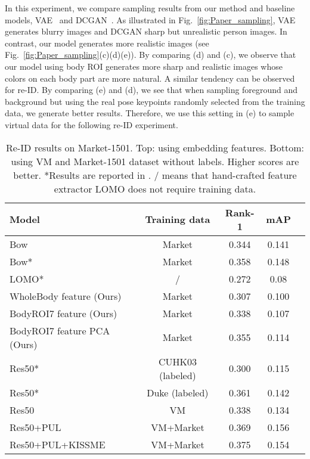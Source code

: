 \documentclass[10pt,twocolumn,letterpaper]{article}
\begin{document}
In this experiment, we compare sampling results from our method and baseline models, \ie VAE~\cite{VAE} and DCGAN~\cite{DCGAN}. 
As illustrated in Fig.~\ref{fig:Paper_sampling}, VAE generates blurry images and DCGAN sharp but unrealistic person images. 
In contrast, our model generates more realistic images (see Fig.~\ref{fig:Paper_sampling}(c)(d)(e)). 
By comparing (d) and (c), we observe that our model using body ROI generates more sharp and realistic images whose colors on each body part are more natural. 
A similar tendency can be observed for re-ID.
By comparing (e) and (d), we see that when sampling foreground and background but using the real pose keypoints randomly selected from the training data, we generate better results. 
Therefore, we use this setting in (e) to sample virtual data for the following re-ID experiment.

\begin{table}
\centering
\footnotesize
\begin{tabular*}{8.4cm}
{@{\extracolsep{\fill}} l c c c c }
\toprule 
Model & Training data & Rank-1 & mAP \\
\midrule[0.6pt]	
	Bow \cite{Market1501} & Market & 0.344 & 0.141 \\
	Bow* \cite{Market1501} & Market & 0.358 & 0.148 \\
    LOMO* \cite{LOMO} & / & 0.272 & 0.08 \\
    WholeBody feature (Ours) & Market & 0.307 & 0.100 \\
    BodyROI7 feature (Ours) & Market & 0.338 & 0.107 \\
    BodyROI7 feature PCA (Ours) & Market & 0.355 & 0.114 \\
\midrule[1pt]
    Res50* \cite{PUL} & CUHK03 (labeled) & 0.300 & 0.115 \\
    Res50* \cite{PUL} & Duke (labeled) & 0.361 & 0.142 \\
    Res50 & VM & 0.338 & 0.134 \\
    Res50+PUL & VM+Market & 0.369 & 0.156 \\
    Res50+PUL+KISSME & VM+Market & 0.375 & 0.154 \\
\bottomrule[1pt]
\end{tabular*}
\vspace{-1.5mm}
\caption{Re-ID results on Market-1501. Top: using embedding features. Bottom: using VM and Market-1501 dataset without labels. Higher scores are better.
*Results are reported in \cite{PUL}. / means that hand-crafted feature extractor LOMO does not require training data.
}
\vspace{-2.5mm}
\label{tab:re-ID}
\end{table}
\end{document}

